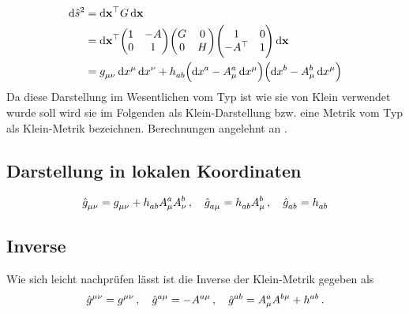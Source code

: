 \begin{equation}
\begin{split}
\dif \hat{s}^2&=\dif \vec{x}\transpose G
\dif \vec{x}\\
&=\dif \vec{x}\transpose
\begin{pmatrix}1& -A\\0& 1\end{pmatrix}
\begin{pmatrix}G& 0\\0& H
\end{pmatrix}
\begin{pmatrix}1& 0\\-A\transpose& 1\end{pmatrix}
\dif \vec{x}\\
&=\tensor{g}{_\mu_\nu}\dif \tensor{x}{^\mu}\dif\tensor{x}{^\nu}
+\tensor{h}{_a_b}\left(\dif\tensor{x}{^a}-\tensor*{A}{^a_\mu}\dif\tensor{x}{^\mu}\right)
\left(\dif\tensor{x}{^b}-\tensor*{A}{^b_\mu}\dif\tensor{x}{^\mu}\right)
\end{split}
\end{equation}
Da diese Darstellung im Wesentlichen vom Typ ist wie sie von Klein verwendet
wurde soll wird sie im Folgenden als Klein-Darstellung bzw. eine Metrik vom Typ
als Klein-Metrik bezeichnen.
Berechnungen angelehnt an \cite{Coquereaux:1990qs} \cite{williams2015field}.
\subsection{Darstellung in lokalen Koordinaten}
\begin{equation}
\tensor{\hat{g}}{_\mu_\nu}=\tensor{g}{_\mu_\nu}+\tensor{h}{_a_b}\tensor*{A}{^a_\mu}\tensor*{A}{^b_\nu}\,,\quad
\tensor{\hat{g}}{_a_\mu}=\tensor{h}{_a_b}\tensor*{A}{^b_\mu}\,,\quad
\tensor{\hat{g}}{_a_b}=\tensor{h}{_a_b}
\end{equation}
\subsection{Inverse}
Wie sich leicht nachprüfen lässt ist die Inverse der Klein-Metrik gegeben als
\begin{equation}
\tensor{\hat{g}}{^\mu^\nu}=\tensor{g}{^\mu^\nu}\,,\quad
\tensor{\hat{g}}{^a^\mu}=-\tensor{A}{^a^\mu}\,,\quad
\tensor{\hat{g}}{^a^b}=\tensor*{A}{^a_\mu}\tensor*{A}{^b^\mu}+\tensor{h}{^a^b}\,.
\end{equation}

